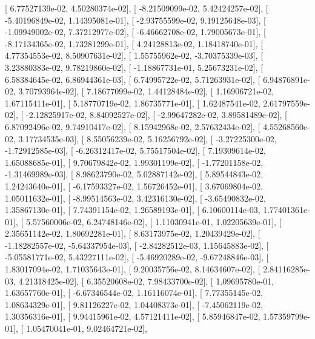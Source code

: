 \documentclass{article}
\begin{document}
       [  6.77527139e-02,   4.50280374e-02],
       [ -8.21509099e-02,   5.42424257e-02],
       [ -5.40196849e-02,   1.14395081e-01],
       [ -2.93755599e-02,   9.19125648e-03],
       [ -1.09949002e-02,   7.37212977e-02],
       [ -6.46662708e-02,   1.79005673e-01],
       [ -8.17134365e-02,   1.73281299e-01],
       [  4.24128813e-02,   1.18418740e-01],
       [  4.77354553e-02,   8.50907631e-02],
       [  1.55755962e-02,  -3.70375339e-03],
       [  3.23880383e-02,   9.78219860e-02],
       [ -1.18867731e-01,   5.25673231e-02],
       [  6.58384645e-02,   6.86944361e-03],
       [  6.74995722e-02,   5.71263931e-02],
       [  6.94876891e-02,   3.70793964e-02],
       [  7.18677099e-02,   1.44128484e-02],
       [  1.16906721e-02,   1.67115411e-01],
       [  5.18770719e-02,   1.86735771e-01],
       [  1.62487541e-02,   2.61797559e-02],
       [ -2.12825917e-02,   8.84092527e-02],
       [ -2.99647282e-02,   3.89581489e-02],
       [  6.87092496e-02,   9.74910417e-02],
       [  8.15942968e-02,   2.57632434e-02],
       [  4.55268560e-02,   3.17734535e-03],
       [  8.55056239e-02,   5.16256792e-02],
       [ -3.27225300e-02,  -1.72912585e-03],
       [ -6.26312417e-02,   5.75517504e-02],
       [  7.19309614e-02,   1.65088685e-01],
       [  9.70679842e-02,   1.99301199e-02],
       [ -1.77201158e-02,  -1.31469989e-03],
       [  8.98623790e-02,   5.02887142e-02],
       [  5.89544843e-02,   1.24243640e-01],
       [ -6.17593327e-02,   1.56726452e-01],
       [  3.67069804e-02,   1.05011632e-01],
       [ -8.99514563e-02,   3.42316130e-02],
       [ -3.65490832e-02,   1.35867130e-01],
       [  7.74391154e-02,   1.26589193e-01],
       [  6.10600114e-03,   1.77401361e-01],
       [  5.57560006e-02,   6.24748146e-02],
       [  1.11030941e-01,   1.02205639e-01],
       [  2.35651142e-02,   1.80692281e-01],
       [  8.63173975e-02,   1.20439429e-02],
       [ -1.18282557e-02,  -5.64337954e-03],
       [ -2.84282512e-03,   1.15645883e-02],
       [ -5.05581771e-02,   5.43227111e-02],
       [ -5.46920289e-02,  -9.67248846e-03],
       [  1.83017094e-02,   1.71035643e-01],
       [  9.20035756e-02,   8.14634607e-02],
       [  2.84116285e-03,   4.21318425e-02],
       [  6.35520608e-02,   7.98433700e-02],
       [  1.09695780e-01,   1.63657760e-01],
       [ -6.67346544e-02,   1.16116074e-01],
       [  7.77355145e-02,   1.08634329e-01],
       [  9.81126227e-02,   1.04408373e-01],
       [ -7.45062119e-02,   1.30356316e-01],
       [  9.94415961e-02,   4.57121411e-02],
       [  5.85946847e-02,   1.57359799e-01],
       [  1.05470041e-01,   9.02464721e-02],
\end{document}
